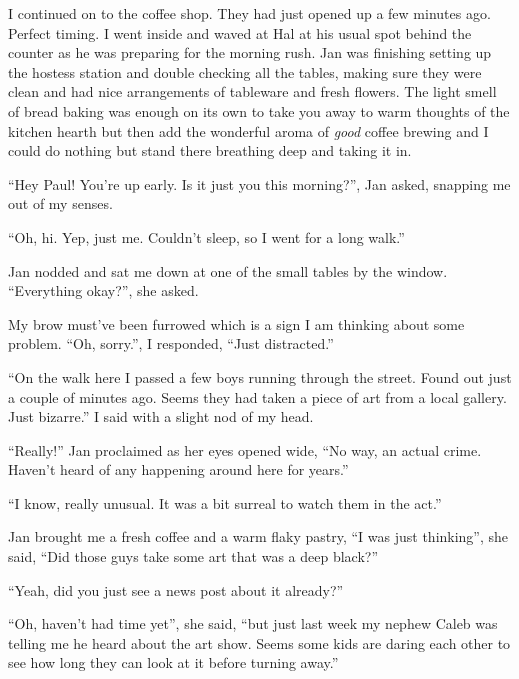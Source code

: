 
I continued on to the coffee shop. They had just opened up a few
minutes ago. Perfect timing. I went inside and waved at Hal at
his usual spot behind the counter as he was preparing for the
morning rush. Jan was finishing setting up the hostess station
and double checking all the tables, making sure they were clean
and had nice arrangements of tableware and fresh flowers.  The
light smell of bread baking was enough on its own to take you
away to warm thoughts of the kitchen hearth but then add the
wonderful aroma of \emph{good} coffee brewing and I could do
nothing but stand there breathing deep and taking it in.

``Hey Paul! You're up early. Is it just you this
morning?'', Jan asked, snapping me out of my senses.

``Oh, hi. Yep, just me. Couldn't sleep, so I went for a long
walk.''

Jan nodded and sat me down at one of the small tables by the
window.  ``Everything okay?'', she asked.

My brow must've been furrowed which is a sign I am thinking
about some problem. ``Oh, sorry.'', I responded, ``Just
distracted.''

``On the walk here I passed a few boys running through the
street.  Found out just a couple of minutes ago. Seems they had
taken a piece of art from a local gallery.  Just bizarre.'' I
said with a slight nod of my head.


``Really!'' Jan proclaimed as her eyes opened wide, ``No way, an
actual crime. Haven't heard of any happening around here for
years.''

``I know, really unusual. It was a bit surreal to watch them in
the act.''

Jan brought me a fresh coffee and a warm flaky pastry,
``I was just thinking'', she said, ``Did those guys take some
art that was a deep black?''

``Yeah, did you just see a news post about it already?''

``Oh, haven't had time yet'', she said, ``but just last week my
nephew Caleb was telling me he heard about the art show.
Seems some kids are daring each other to see how long they
can look at it before turning away.''

